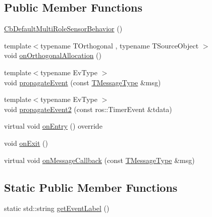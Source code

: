 \subsection*{Public Member Functions}
\begin{DoxyCompactItemize}
\item 
\hyperlink{classcl__multirole__sensor_1_1CbDefaultMultiRoleSensorBehavior_af4228e5fdc6401b13f66bb066c28ec39}{Cb\+Default\+Multi\+Role\+Sensor\+Behavior} ()
\item 
{\footnotesize template$<$typename T\+Orthogonal , typename T\+Source\+Object $>$ }\\void \hyperlink{classcl__multirole__sensor_1_1CbDefaultMultiRoleSensorBehavior_a28b95d00ed02dde8779cc23101961294}{on\+Orthogonal\+Allocation} ()
\item 
{\footnotesize template$<$typename Ev\+Type $>$ }\\void \hyperlink{classcl__multirole__sensor_1_1CbDefaultMultiRoleSensorBehavior_af0017775207108c81f879fe222a69ea9}{propagate\+Event} (const \hyperlink{classcl__multirole__sensor_1_1CbDefaultMultiRoleSensorBehavior_aa23bc8c99de1eddad01d094bdab62aa4}{T\+Message\+Type} \&msg)
\item 
{\footnotesize template$<$typename Ev\+Type $>$ }\\void \hyperlink{classcl__multirole__sensor_1_1CbDefaultMultiRoleSensorBehavior_ac8773ca7b467bad85219261f5d23a3ce}{propagate\+Event2} (const ros\+::\+Timer\+Event \&tdata)
\item 
virtual void \hyperlink{classcl__multirole__sensor_1_1CbDefaultMultiRoleSensorBehavior_a5ac29f93cc91e23715f51ade94467cae}{on\+Entry} () override
\item 
void \hyperlink{classcl__multirole__sensor_1_1CbDefaultMultiRoleSensorBehavior_a0f400c7e29d0cb1dda11242a5a922f4c}{on\+Exit} ()
\item 
virtual void \hyperlink{classcl__multirole__sensor_1_1CbDefaultMultiRoleSensorBehavior_a80a89078befa7f6d813fb3c5773bc83c}{on\+Message\+Callback} (const \hyperlink{classcl__multirole__sensor_1_1CbDefaultMultiRoleSensorBehavior_aa23bc8c99de1eddad01d094bdab62aa4}{T\+Message\+Type} \&msg)
\end{DoxyCompactItemize}
\subsection*{Static Public Member Functions}
\begin{DoxyCompactItemize}
\item 
static std\+::string \hyperlink{classcl__multirole__sensor_1_1CbDefaultMultiRoleSensorBehavior_aced8a722660f2ecd7bad11a9dde31aa8}{get\+Event\+Label} ()
\end{DoxyCompactItemize}

